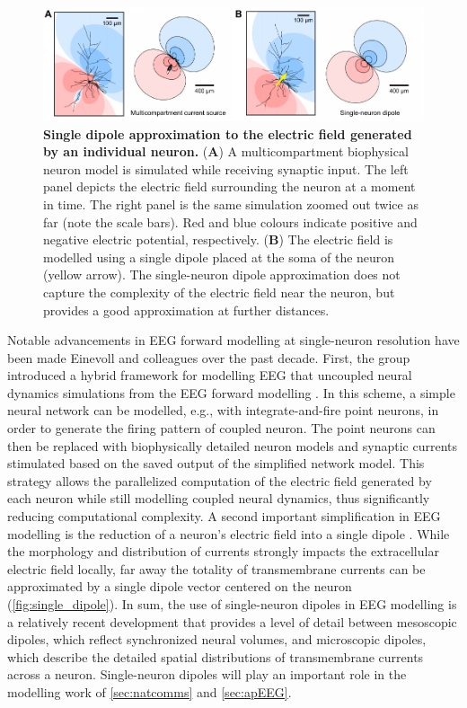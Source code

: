 \begin{figure}[b!]
    \centering
    \includegraphics[width=\textwidth]{Figures/chapter1/single_neuron_dipole.pdf}
    
    \caption{\textbf{Single dipole approximation to the electric field generated by an individual neuron.} 
    (\textbf{A}) A multicompartment biophysical neuron model is simulated while receiving synaptic input. The left panel depicts the electric field surrounding the neuron at a moment in time. The right panel is the same simulation zoomed out twice as far (note the scale bars). Red and blue colours indicate positive and negative electric potential, respectively. (\textbf{B}) The electric field is modelled using a single dipole placed at the soma of the neuron (yellow arrow). The single-neuron dipole approximation does not capture the complexity of the electric field near the neuron, but provides a good approximation at further distances.} 
    \label{fig:single_dipole}
\end{figure}

Notable advancements in EEG forward modelling at single-neuron resolution have been made Einevoll and colleagues over the past decade. First, the group introduced a hybrid framework for modelling EEG that uncoupled neural dynamics simulations from the EEG forward modelling \cite{Hagen2016, Linden2014,Mazzoni2015}. In this scheme, a simple neural network can be modelled, e.g., with integrate-and-fire point neurons, in order to generate the firing pattern of coupled neuron. The point neurons can then be replaced with biophysically detailed neuron models and synaptic currents stimulated based on the saved output of the simplified network model. This strategy allows the parallelized computation of the electric field generated by each neuron while still modelling coupled neural dynamics, thus significantly reducing computational complexity. A second important simplification in EEG modelling is the reduction of a neuron's electric field into a single dipole \cite{Næss2021}. While the morphology and distribution of currents strongly impacts the extracellular electric field locally, far away the totality of transmembrane currents can be approximated by a single dipole vector centered on the neuron (\autoref{fig:single_dipole}). In sum, the use of single-neuron dipoles in EEG modelling is a relatively recent development that provides a level of detail between mesoscopic dipoles, which reflect synchronized neural volumes, and microscopic dipoles, which describe the detailed spatial distributions of transmembrane currents across a neuron. Single-neuron dipoles will play an important role in the modelling work of \autoref{sec:natcomms} and \autoref{sec:apEEG}.

